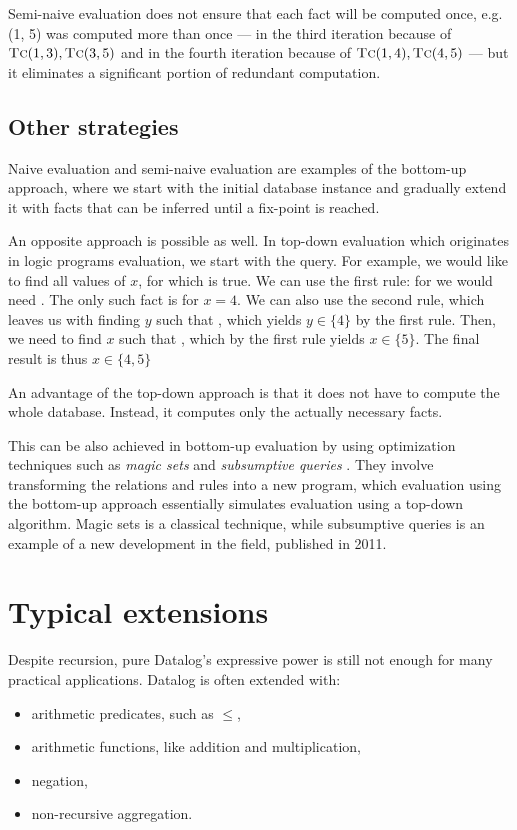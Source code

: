Semi-naive evaluation does not ensure that each fact will be computed once, e.g. (1, 5) was computed more than once --- in the third iteration because of $\textsc{Tc}(1, 3), \textsc{Tc}(3, 5)$ and in the fourth iteration because of $\textsc{Tc}(1, 4), \textsc{Tc}(4, 5)$ --- but it eliminates a significant portion of redundant computation.

\subsection{Other strategies}
Naive evaluation and semi-naive evaluation are examples of the bottom-up approach, where we start with the initial database instance and gradually extend it with facts that can be inferred until a fix-point is reached.

An opposite approach is possible as well. In top-down evaluation which originates in logic programs evaluation, we start with the query. For example, we would like to find all values of $x$, for which  is true. We can use the first rule: for  we would need . The only such fact is  for $x=4$. We can also use the second rule, which leaves us with finding $y$ such that , which yields $y \in \{4\}$ by the first rule. Then, we need to find $x$ such that , which by the first rule yields $x \in \{5\}$. The final result is thus $x \in \{4, 5\}$

An advantage of the top-down approach is that it does not have to compute the whole database. Instead, it computes only the actually necessary facts.

This can be also achieved in bottom-up evaluation by using optimization techniques such as \emph{magic sets} \cite{magicsets, fod} and \emph{subsumptive queries} \cite{subsumptivequeries}. They involve transforming the relations and rules into a new program, which evaluation using the bottom-up approach essentially simulates evaluation using a top-down algorithm. Magic sets is a classical technique, while subsumptive queries is an example of a new development in the field, published in 2011.

\section{Typical extensions}
Despite recursion, pure Datalog's expressive power is still not enough for many practical applications. Datalog is often extended with:
\begin{itemize}
\item arithmetic predicates, such as $\le$,
\item arithmetic functions, like addition and multiplication,
\item negation,
\item non-recursive aggregation.
\end{itemize}

